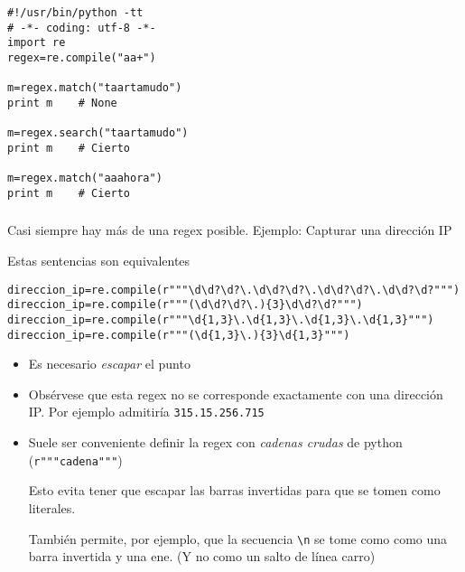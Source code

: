 \documentclass[ucs]{beamer}
\begin{document}
\begin{frame}[fragile]

  \begin{footnotesize}
  \begin{verbatim}
#!/usr/bin/python -tt
# -*- coding: utf-8 -*-
import re
regex=re.compile("aa+")

m=regex.match("taartamudo")
print m    # None

m=regex.search("taartamudo")
print m    # Cierto

m=regex.match("aaahora")
print m    # Cierto
  \end{verbatim}
  \end{footnotesize}

\end{frame}

\begin{frame}[fragile]
\frametitle{}
Casi siempre hay más de una regex posible. Ejemplo: Capturar una dirección
IP

Estas sentencias son equivalentes

  \begin{footnotesize}
  \begin{verbatim}
direccion_ip=re.compile(r"""\d\d?\d?\.\d\d?\d?\.\d\d?\d?\.\d\d?\d?""")
direccion_ip=re.compile(r"""(\d\d?\d?\.){3}\d\d?\d?""")
direccion_ip=re.compile(r"""\d{1,3}\.\d{1,3}\.\d{1,3}\.\d{1,3}""")
direccion_ip=re.compile(r"""(\d{1,3}\.){3}\d{1,3}""")
  \end{verbatim}
  \end{footnotesize}

\begin{itemize}
\item
Es necesario \emph{escapar} el punto
\item
Obsérvese que esta regex no se corresponde exactamente con una dirección
IP. Por ejemplo admitiría \verb|315.15.256.715|

\item
Suele ser conveniente definir la regex con \emph{cadenas crudas} de python (\verb|r"""cadena"""|)

Esto evita tener que escapar las barras invertidas para que se tomen
como literales. 

También permite, por ejemplo, que la secuencia \verb|\n| se tome como
como una barra invertida y una ene. (Y no como un salto de línea carro)

\end{itemize}

\end{frame}
\end{document}
